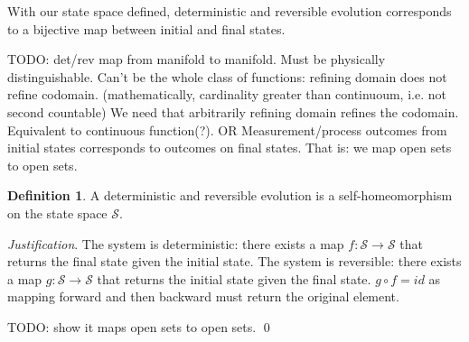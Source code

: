 \documentclass[aps,pra,10pt,twocolumn,floatfix,nofootinbib]{revtex4-1}
\theoremstyle{definition}
\newtheorem{defn}[prop]{Definition}
\newenvironment{justification}{\emph{Justification}.}{\qed}
\begin{document}
With our state space defined, deterministic and reversible evolution corresponds to a bijective map between initial and final states.

TODO: det/rev map from manifold to manifold. Must be physically distinguishable. Can't be the whole class of functions: refining domain does not refine codomain. (mathematically, cardinality greater than continuoum, i.e. not second countable) We need that arbitrarily refining domain refines the codomain. Equivalent to continuous function(?). OR Measurement/process outcomes from initial states corresponds to outcomes on final states. That is: we map open sets to open sets.

\begin{defn}\label{detrevmap}
A deterministic and reversible evolution is a self-homeomorphism on the state space $\mathcal{S}$.
\end{defn}

\begin{justification}
The system is deterministic: there exists a map $f:\mathcal{S} \rightarrow \mathcal{S}$ that returns the final state given the initial state. The system is reversible: there exists a map $g:\mathcal{S} \rightarrow \mathcal{S}$ that returns the initial state given the final state. $g \circ f = id$ as mapping forward and then backward must return the original element.

TODO: show it maps open sets to open sets.
\end{justification}
\end{document}
